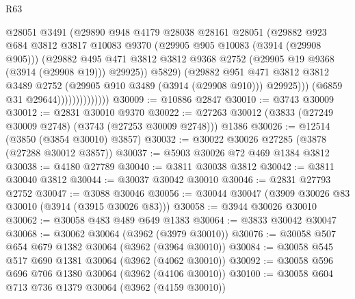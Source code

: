 \begin{lexlean}{R63}
\begin{coremodule}
                                  @28051
                                  @3491
                                  (@29890
                                    @948
                                    @4179
                                    @28038
                                    @28161
                                    @28051
                                    (@29882
                                      @923
                                      @684
                                      @3812
                                      @3817
                                      @10083
                                      @9370
                                      (@29905 @905 @10083 (@3914 (@29908 @905)))
                                      (@29882
                                        @495
                                        @471
                                        @3812
                                        @3812
                                        @9368
                                        @2752
                                        (@29905 @19 @9368 (@3914 (@29908 @19)))
                                        @29925))
                                    @5829)
                                  (@29882
                                    @951
                                    @471
                                    @3812
                                    @3812
                                    @3489
                                    @2752
                                    (@29905 @910 @3489 (@3914 (@29908 @910)))
                                    @29925)))
                              (@6859 @31 @29644))))))))))))))
@30009 := @10886 @2847
@30010 := @3743 @30009
@30012 := @2831 @30010 @9370
@30022 := @27263 @30012 (@3833 (@27249 @30009 @2748) (@3743 (@27253 @30009 @2748))) @1386
@30026 := @12514 (@3850 (@3854 @30010) @3857)
@30032 := @30022 @30026 @27285 (@3878 (@27288 @30012 @3857))
@30037 := @5903 @30026 @72 @469 @1384 @3812
@30038 := @4180 @27789
@30040 := @3811 @30038 @3812
@30042 := @3811 @30040 @3812
@30044 := @30037 @30042 @30010
@30046 := @2831 @27793 @2752
@30047 := @3088 @30046
@30056 := @30044 @30047 (@3909 @30026 @83 @30010 (@3914 (@3915 @30026 @83)))
@30058 := @3944 @30026 @30010
@30062 := @30058 @483 @489 @649 @1383
@30064 := @3833 @30042 @30047
@30068 := @30062 @30064 (@3962 (@3979 @30010))
@30076 := @30058 @507 @654 @679 @1382 @30064 (@3962 (@3964 @30010))
@30084 := @30058 @545 @517 @690 @1381 @30064 (@3962 (@4062 @30010))
@30092 := @30058 @596 @696 @706 @1380 @30064 (@3962 (@4106 @30010))
@30100 := @30058 @604 @713 @736 @1379 @30064 (@3962 (@4159 @30010))

\end{coremodule}
\end{lexlean}
